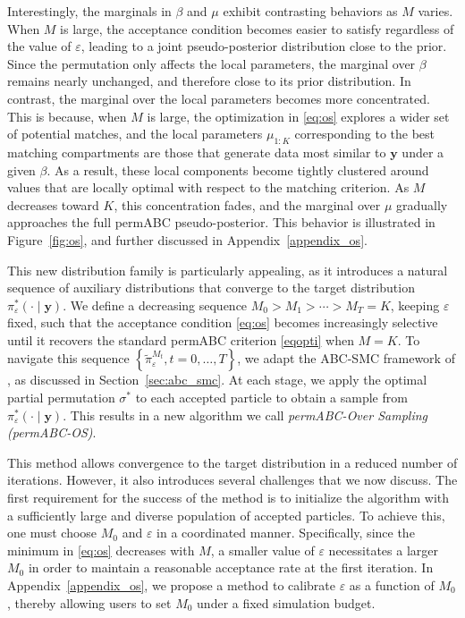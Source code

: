 \documentclass[11pt,a4paper]{article}
\def\globparam{\beta}
\def\locparam{\mu}
\def\obsdata{\mathbf{y}}
\theoremstyle{plain}
\theoremstyle{definition}
\theoremstyle{remark}
\begin{document}
Interestingly, the marginals in $\globparam$ and $\locparam$ exhibit contrasting behaviors as $M$ varies. When $M$ is large, the acceptance condition becomes easier to satisfy regardless of the value of $\varepsilon$, leading to a joint pseudo-posterior distribution close to the prior. Since the permutation only affects the local parameters, the marginal over $\globparam$ remains nearly unchanged, and therefore close to its prior distribution. In contrast, the marginal over the local parameters becomes more concentrated. This is because, when $M$ is large, the optimization in \eqref{eq:os} explores a wider set of potential matches, and the local parameters $\locparam_{1:K}$ corresponding to the best matching compartments are those that generate data most similar to $\obsdata$ under a given $\globparam$. As a result, these local components become tightly clustered around values that are locally optimal with respect to the matching criterion. As $M$ decreases toward $K$, this concentration fades, and the marginal over $\locparam$ gradually approaches the full permABC pseudo-posterior. This behavior is illustrated in Figure~\ref{fig:os}, and further discussed in Appendix~\ref{appendix_os}.

This new distribution family is particularly appealing, as it introduces a natural sequence of auxiliary distributions that converge to the target distribution \( \pi_\varepsilon^*(\cdot \mid \obsdata) \). We define a decreasing sequence \( M_0 > M_1 > \cdots > M_T = K \), keeping \( \varepsilon \) fixed, such that the acceptance condition \eqref{eq:os} becomes increasingly selective until it recovers the standard permABC criterion \eqref{eqopti} when \( M = K \). 
To navigate this sequence \( \left \{\tilde{\pi}_\varepsilon^{M_t}, t = 0, \dots, T \right\} \), we adapt the ABC-SMC framework of \citet{delmoralAdaptiveSequentialMonte2012}, as discussed in Section~\ref{sec:abc_smc}. At each stage, we apply the optimal partial permutation \( \sigma^* \) to each accepted particle to obtain a sample from \( \pi_\varepsilon^*(\cdot \mid \obsdata) \). This results in a new algorithm we call \emph{permABC-Over Sampling (permABC-OS)}.

This method  allows convergence to the target distribution in a reduced number of iterations. However, it also introduces several challenges that we now discuss. The first requirement for the success of the method is to initialize the algorithm with a sufficiently large and diverse population of accepted particles. To achieve this, one must choose $M_0$ and $\varepsilon$ in a coordinated manner. Specifically, since the minimum in \eqref{eq:os} decreases with $M$, a smaller value of $\varepsilon$ necessitates a larger $M_0$ in order to maintain a reasonable acceptance rate at the first iteration. In Appendix~\ref{appendix_os}, we propose a method to calibrate $\varepsilon$ as a function of $M_0$, thereby allowing users to set $M_0$ under a fixed simulation budget.
\end{document}
